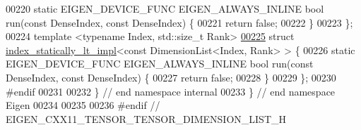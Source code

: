 \begin{DoxyCode}
00220   \textcolor{keyword}{static} EIGEN\_DEVICE\_FUNC EIGEN\_ALWAYS\_INLINE \textcolor{keywordtype}{bool} run(\textcolor{keyword}{const} DenseIndex, \textcolor{keyword}{const} DenseIndex) \{
00221     \textcolor{keywordflow}{return} \textcolor{keyword}{false};
00222   \}
00223 \};
00224 \textcolor{keyword}{template} <\textcolor{keyword}{typename} Index, std::\textcolor{keywordtype}{size\_t} Rank>
\hyperlink{struct_eigen_1_1internal_1_1index__statically__lt__impl_3_01const_01_dimension_list_3_01_index_00_01_rank_01_4_01_4}{00225} \textcolor{keyword}{struct }\hyperlink{struct_eigen_1_1internal_1_1index__statically__lt__impl}{index\_statically\_lt\_impl}<const DimensionList<Index, Rank> > \{
00226   \textcolor{keyword}{static} EIGEN\_DEVICE\_FUNC EIGEN\_ALWAYS\_INLINE \textcolor{keywordtype}{bool} run(\textcolor{keyword}{const} DenseIndex, \textcolor{keyword}{const} DenseIndex) \{
00227     \textcolor{keywordflow}{return} \textcolor{keyword}{false};
00228   \}
00229 \};
00230 \textcolor{preprocessor}{#endif}
00231 
00232 \}  \textcolor{comment}{// end namespace internal}
00233 \}  \textcolor{comment}{// end namespace Eigen}
00234 
00235 
00236 \textcolor{preprocessor}{#endif // EIGEN\_CXX11\_TENSOR\_TENSOR\_DIMENSION\_LIST\_H}
\end{DoxyCode}
